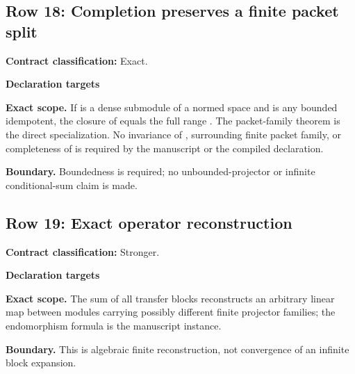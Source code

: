 \subsection{Row 18: Completion preserves a finite packet split}
\label{row:18}
\textbf{Contract classification:} Exact.
\par\smallskip\textbf{Declaration targets}\par
{\small\noindent{}\par}
{\small\noindent{}\par}
\medskip\noindent\textbf{Exact scope.} If  is a dense submodule of a normed space and  is any bounded idempotent, the closure of  equals the full range . The packet-family theorem is the direct specialization. No invariance of , surrounding finite packet family, or completeness of  is required by the manuscript or the compiled declaration.
\par\smallskip\noindent\textbf{Boundary.} Boundedness is required; no unbounded-projector or infinite conditional-sum claim is made.
\medskip
\subsection{Row 19: Exact operator reconstruction}
\label{row:19}
\textbf{Contract classification:} Stronger.
\par\smallskip\textbf{Declaration targets}\par
{\small\noindent{}\par}
{\small\noindent{}\par}
\medskip\noindent\textbf{Exact scope.} The sum of all transfer blocks reconstructs an arbitrary linear map between modules carrying possibly different finite projector families; the endomorphism formula is the manuscript instance.
\par\smallskip\noindent\textbf{Boundary.} This is algebraic finite reconstruction, not convergence of an infinite block expansion.
\medskip
